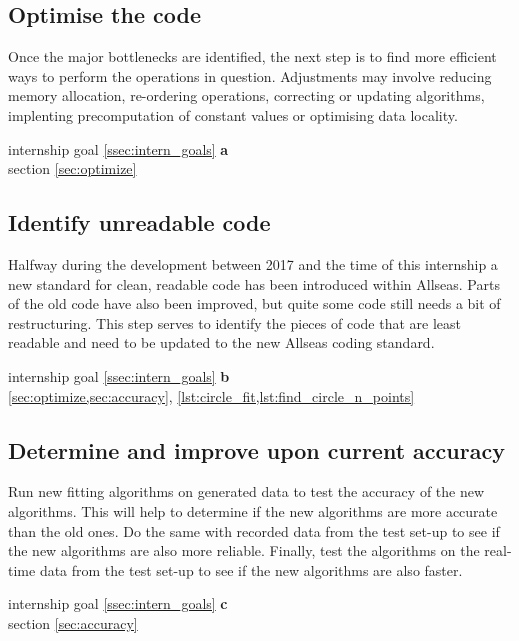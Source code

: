 \subsection{Optimise the code} \label{ssec:optimize_code}
Once the major bottlenecks are identified, the next step is to find more efficient ways to perform the operations in question. Adjustments
may involve reducing memory allocation, re-ordering operations, correcting or updating algorithms, implenting precomputation of constant values
or optimising data locality.
\begin{flushright}
     internship goal \ref{ssec:intern_goals} \textbf{a}\\
    \large{} section \ref{sec:optimize}
\end{flushright}

\subsection{Identify unreadable code} \label{ssec:unreadable_code}
Halfway during the development between 2017 and the time of this internship a new standard for clean, readable code has been
introduced within Allseas. Parts of the old code have also been improved, but quite some code still needs a bit of restructuring.
This step serves to identify the pieces of code that are least readable and need to be updated to the new Allseas coding standard.
\begin{flushright}
     internship goal \ref{ssec:intern_goals} \textbf{b}\\
    \large{} \cref{sec:optimize,sec:accuracy}, \cref{lst:circle_fit,lst:find_circle_n_points}
\end{flushright}

\subsection{Determine and improve upon current accuracy} \label{ssec:test_accuracy}
Run new fitting algorithms on generated data to test the accuracy of the new algorithms.
This will help to determine if the new algorithms are more accurate than the old ones. Do the same
with recorded data from the test set-up to see if the new algorithms are also more reliable. Finally,
test the algorithms on the real-time data from the test set-up to see if the new algorithms are also faster.
\begin{flushright}
     internship goal \ref{ssec:intern_goals} \textbf{c}\\
    \large{} section \ref{sec:accuracy}
\end{flushright}

